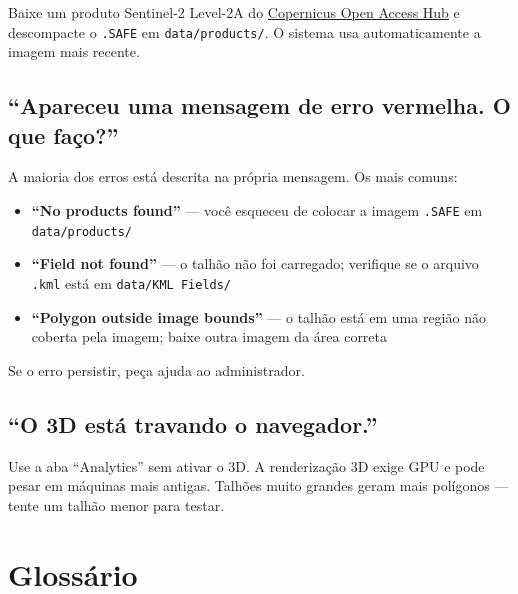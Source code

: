\documentclass[11pt, a4paper]{article}
\begin{document}
Baixe um produto Sentinel-2 Level-2A do \href{https://browser.dataspace.copernicus.eu/}{Copernicus Open Access Hub} e descompacte o \texttt{.SAFE} em \texttt{data/products/}. O sistema usa automaticamente a imagem mais recente.

\subsection*{``Apareceu uma mensagem de erro vermelha. O que faço?''}

A maioria dos erros está descrita na própria mensagem. Os mais comuns:

\begin{itemize}
  \item \textbf{``No products found''} --- você esqueceu de colocar a imagem \texttt{.SAFE} em \texttt{data/products/}
  \item \textbf{``Field not found''} --- o talhão não foi carregado; verifique se o arquivo \texttt{.kml} está em \texttt{data/KML Fields/}
  \item \textbf{``Polygon outside image bounds''} --- o talhão está em uma região não coberta pela imagem; baixe outra imagem da área correta
\end{itemize}

Se o erro persistir, peça ajuda ao administrador.

\subsection*{``O 3D está travando o navegador.''}

Use a aba ``Analytics'' sem ativar o 3D. A renderização 3D exige GPU e pode pesar em máquinas mais antigas. Talhões muito grandes geram mais polígonos --- tente um talhão menor para testar.

\section{Glossário}
\end{document}
